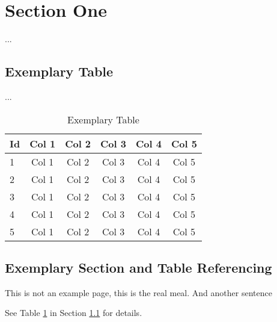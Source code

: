 \clearpage
\section{Section One}
\label{sec:Intro}
...

\subsection{Exemplary Table}
\label{subsec:Intro/table}
...



\begin{longtable}{l|ccccc}
  \caption{Exemplary Table}
  \label{table:table-1}
  \\
  \textbf{Id} & \textbf{Col 1} & \textbf{Col 2}& \textbf{Col 3} & \textbf{Col 4} & \textbf{Col 5}\\
  \hline
  1 & Col 1 & Col 2 & Col 3 & Col 4 & Col 5\\
  2 & Col 1 & Col 2 & Col 3 & Col 4 & Col 5\\
  3 & Col 1 & Col 2 & Col 3 & Col 4 & Col 5\\
  4 & Col 1 & Col 2 & Col 3 & Col 4 & Col 5\\
  5 & Col 1 & Col 2 & Col 3 & Col 4 & Col 5\\
\end{longtable}

\subsection{Exemplary Section and Table Referencing}
\label{subsec:Intro/rfs}

This is not an example page, this is the real meal. And another sentence

See Table \ref{table:table-1} in Section \ref{subsec:Intro/table}  for details.
